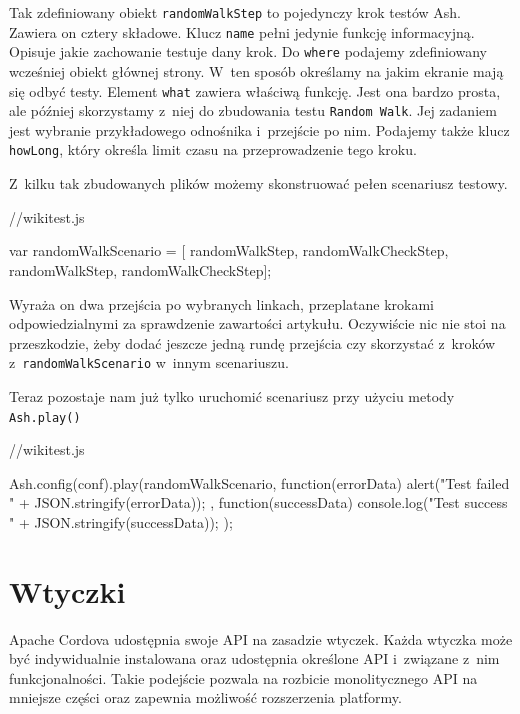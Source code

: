\documentclass{xmgr}
\begin{document}
Tak zdefiniowany obiekt \texttt{randomWalkStep} to pojedynczy krok testów Ash. Zawiera on cztery składowe. Klucz \texttt{name} pełni jedynie funkcję informacyjną. Opisuje jakie zachowanie testuje dany krok. Do \texttt{where} podajemy zdefiniowany wcześniej obiekt głównej strony. W~ten sposób określamy na jakim ekranie mają się odbyć testy. Element \texttt{what} zawiera właściwą funkcję. Jest ona bardzo prosta, ale później skorzystamy z~niej do zbudowania testu \texttt{Random Walk}. Jej zadaniem jest wybranie przykładowego odnośnika i~przejście po nim. Podajemy także klucz \texttt{howLong}, który określa limit czasu na przeprowadzenie tego kroku.

Z~kilku tak zbudowanych plików możemy skonstruować pełen scenariusz testowy.

\begin{javascriptcode}
   //wikitest.js

   var randomWalkScenario = [
        randomWalkStep,
        randomWalkCheckStep,
        randomWalkStep,
        randomWalkCheckStep];

\end{javascriptcode}

\noindent Wyraża on dwa przejścia po wybranych linkach, przeplatane krokami odpowiedzialnymi za sprawdzenie zawartości artykułu. Oczywiście nic nie stoi na przeszkodzie, żeby dodać jeszcze jedną rundę przejścia czy skorzystać z~kroków z~\texttt{randomWalkScenario} w~innym scenariuszu.

Teraz pozostaje nam już tylko uruchomić scenariusz przy użyciu metody \texttt{Ash.play()}

\begin{javascriptcode}
   //wikitest.js

   Ash.config(conf).play(randomWalkScenario, function(errorData){
        alert("Test failed " + JSON.stringify(errorData));
    }, function(successData){
        console.log("Test success " + JSON.stringify(successData));
    });

\end{javascriptcode}

\chapter{Wtyczki}

Apache Cordova udostępnia swoje API na zasadzie wtyczek. Każda wtyczka może być indywidualnie instalowana oraz udostępnia określone API i~związane z~nim funkcjonalności. Takie podejście pozwala na rozbicie monolitycznego API na mniejsze części oraz zapewnia możliwość rozszerzenia platformy.
\end{document}
